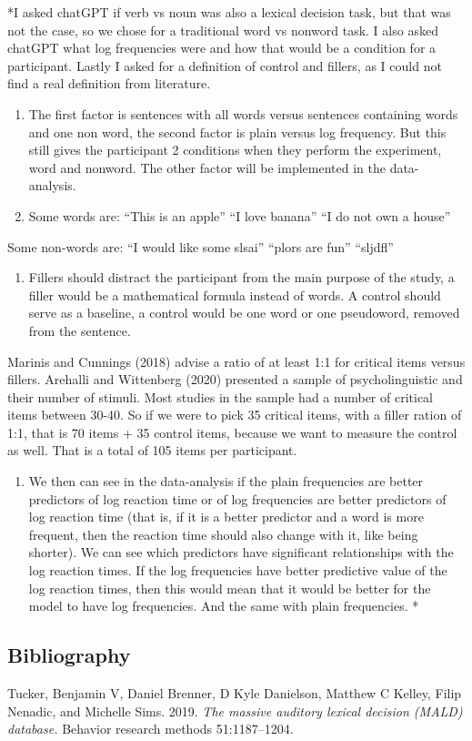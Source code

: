 \documentclass[
]{article}
\providecommand{\tightlist}{%
  \setlength{\itemsep}{0pt}\setlength{\parskip}{0pt}}
\begin{document}
*I asked chatGPT if verb vs noun was also a lexical decision task, but
that was not the case, so we chose for a traditional word vs nonword
task. I also asked chatGPT what log frequencies were and how that would
be a condition for a participant. Lastly I asked for a definition of
control and fillers, as I could not find a real definition from
literature.

\begin{enumerate}
\def\labelenumi{(\roman{enumi})}
\item
  The first factor is sentences with all words versus sentences
  containing words and one non word, the second factor is plain versus
  log frequency. But this still gives the participant 2 conditions when
  they perform the experiment, word and nonword. The other factor will
  be implemented in the data-analysis.
\item
  Some words are: ``This is an apple'' ``I love banana'' ``I do not own
  a house''
\end{enumerate}

Some non-words are: ``I would like some slsai'' ``plors are fun''
``sljdfl''

\begin{enumerate}
\def\labelenumi{(\roman{enumi})}
\setcounter{enumi}{2}
\tightlist
\item
  Fillers should distract the participant from the main purpose of the
  study, a filler would be a mathematical formula instead of words. A
  control should serve as a baseline, a control would be one word or one
  pseudoword, removed from the sentence.
\end{enumerate}

Marinis and Cunnings (2018) advise a ratio of at least 1:1 for critical
items versus fillers. Arehalli and Wittenberg (2020) presented a sample
of psycholinguistic and their number of stimuli. Most studies in the
sample had a number of critical items between 30-40. So if we were to
pick 35 critical items, with a filler ration of 1:1, that is 70 items +
35 control items, because we want to measure the control as well. That
is a total of 105 items per participant.

\begin{enumerate}
\def\labelenumi{(\alph{enumi})}
\setcounter{enumi}{21}
\tightlist
\item
  We then can see in the data-analysis if the plain frequencies are
  better predictors of log reaction time or of log frequencies are
  better predictors of log reaction time (that is, if it is a better
  predictor and a word is more frequent, then the reaction time should
  also change with it, like being shorter). We can see which predictors
  have significant relationships with the log reaction times. If the log
  frequencies have better predictive value of the log reaction times,
  then this would mean that it would be better for the model to have log
  frequencies. And the same with plain frequencies. *
\end{enumerate}

\hypertarget{bibliography}{%
\subsection{Bibliography}\label{bibliography}}

Tucker, Benjamin V, Daniel Brenner, D Kyle Danielson, Matthew C Kelley,
Filip Nenadic, and Michelle Sims. 2019. \emph{The massive auditory
lexical decision (MALD) database.} Behavior research methods
51:1187--1204.
\end{document}
